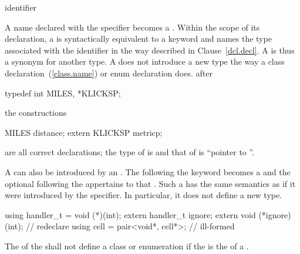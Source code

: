 \begin{bnf}
\br
    identifier
\end{bnf}

A name declared with the  specifier becomes a
. Within the scope of its declaration, a
 is syntactically equivalent to a keyword and
names the type associated with the identifier in the way described in
Clause~\ref{dcl.decl}.
%
%
%
A  is thus a synonym for another type. A
 does not introduce a new type the way a class
declaration~(\ref{class.name}) or enum declaration does.
\enterexample
{}%
after

\begin{codeblock}
typedef int MILES, *KLICKSP;
\end{codeblock}

the constructions

\begin{codeblock}
MILES distance;
extern KLICKSP metricp;
\end{codeblock}

are all correct declarations; the type of  is
 and that of  is ``pointer to ''.
\exitexample

\pnum
A  can also be introduced by an
. The  following the
 keyword becomes a 
and the optional  following the
 appertains to that .
Such a  has the same
semantics as if it were introduced by the  specifier. In
particular, it does not define a new type.
\enterexample

\begin{codeblock}
using handler_t = void (*)(int);
extern handler_t ignore;
extern void (*ignore)(int);         // redeclare 
using cell = pair<void*, cell*>;    // ill-formed
\end{codeblock}

\exitexample
The 
of the  shall not define
a class or enumeration if the 
is the  of a .

